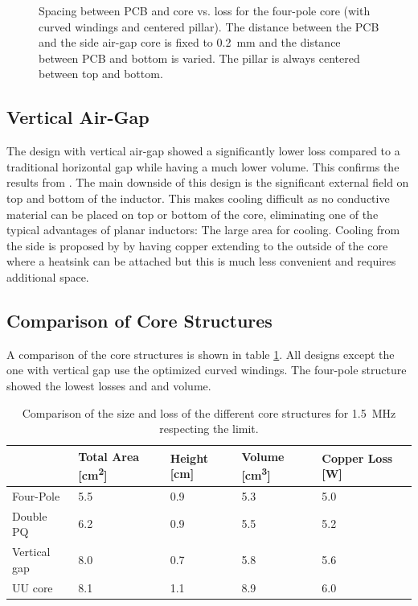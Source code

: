 \documentclass{IPEC2026}
\newcommand{\sbl}[1]{\glssymbol{#1}}
\begin{document}
\begin{figure}
  \centering
  
  \caption{Spacing between PCB and core vs. loss for the four-pole core (with curved windings and centered pillar). The distance between the PCB and the side air-gap core is fixed to \qty{0.2}{\mm} and the distance between PCB and bottom is varied. The pillar is always centered between top and bottom.}
  \label{fig:fourPole_spacingVsLoss}
\end{figure}

\subsection{Vertical Air-Gap}
The design with vertical air-gap showed a significantly lower loss compared to a traditional horizontal gap while having a much lower volume. This confirms the results from \cite{schaferNovelHighlyEfficient2020}. The main downside of this design is the significant external field on top and bottom of the inductor. This makes cooling difficult as no conductive material can be placed on top or bottom of the core, eliminating one of the typical advantages of planar inductors: The large area for cooling. Cooling from the side is proposed by \cite{schaferNovelHighlyEfficient2020} by having copper extending to the outside of the core where a heatsink can be attached but this is much less convenient and requires additional space.

\subsection{Comparison of Core Structures}
A comparison of the core structures is shown in table \ref{tab:InductorComparison}. All designs except the one with vertical gap use the optimized curved windings. The four-pole structure showed the lowest losses and and volume.
\begin{table}
  \centering
  \caption{Comparison of the size and loss of the different core structures for \qty{1.5}{\MHz} respecting the \sbl{Hdc} limit.}
    \begin{tabularx}{\columnwidth}{|l|X|X|X|X|}
      \hline
          & {Total Area [\unit{\cm\squared}]} & {Height [\unit{\cm}]} & {Volume [\unit{\cubic\cm}]} & {Copper Loss [\unit{\W}]} \\
      \hline
      \hline
      Four-Pole & 5.5 & 0.9 & 5.3 & 5.0 \\
      \hline
      Double PQ & 6.2 & 0.9 & 5.5 & 5.2 \\
      \hline
      Vertical gap & 8.0 & 0.7 & 5.8 & 5.6 \\
      \hline
      UU core & 8.1 & 1.1 & 8.9 & 6.0 \\
      \hline
    \end{tabularx}%
  \label{tab:InductorComparison}%
\end{table}%
\end{document}
